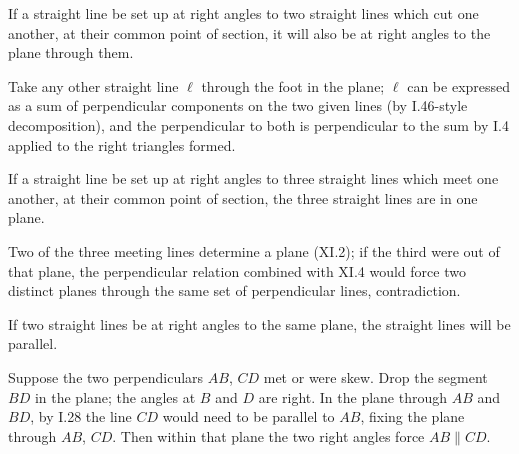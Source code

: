 \begin{claim}
\label{prop:XI.4}
If a straight line be set up at right angles to two straight lines
which cut one another, at their common point of section, it will
also be at right angles to the plane through them.
\end{claim}
\begin{evidence}[Proof of XI.4]
\label{ev:XI.4}
Take any other straight line $\ell$ through the foot in the plane;
$\ell$ can be expressed as a sum of perpendicular components on the
two given lines (by I.46-style decomposition), and the perpendicular
to both is perpendicular to the sum by I.4 applied to the right
triangles formed.
\end{evidence}

\begin{claim}
\label{prop:XI.5}
If a straight line be set up at right angles to three straight lines
which meet one another, at their common point of section, the three
straight lines are in one plane.
\end{claim}
\begin{evidence}[Proof of XI.5]
\label{ev:XI.5}
Two of the three meeting lines determine a plane (XI.2); if the
third were out of that plane, the perpendicular relation combined
with XI.4 would force two distinct planes through the same set of
perpendicular lines, contradiction.
\end{evidence}

\begin{claim}
\label{prop:XI.6}
If two straight lines be at right angles to the same plane, the
straight lines will be parallel.
\end{claim}
\begin{evidence}[Proof of XI.6]
\label{ev:XI.6}
Suppose the two perpendiculars $AB$, $CD$ met or were skew.  Drop
the segment $BD$ in the plane; the angles at $B$ and $D$ are right.
In the plane through $AB$ and $BD$, by I.28 the line $CD$ would
need to be parallel to $AB$, fixing the plane through $AB$, $CD$.
Then within that plane the two right angles force $AB \parallel CD$.
\end{evidence}

